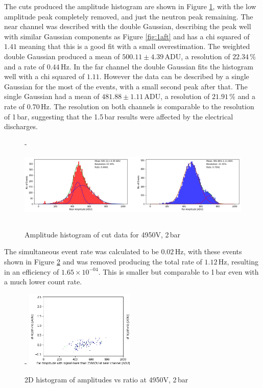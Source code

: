 \documentclass[a4paper]{article}
\begin{document}
\noindent The cuts produced the amplitude histogram are shown in Figure \ref{fig:3amp}, with the low amplitude peak completely removed, and just the neutron peak remaining. 
\newline The near channel was described with the double Gaussian, describing the peak well with similar Gaussian components as Figure \ref{fig:1aft} and has a chi squared of $1.41$ meaning that this is a good fit with a small overestimation. The weighted double Gaussian produced a mean of $500.11 \pm 4.39$\,ADU, a resolution of $22.34$\,\% and a rate of $0.44$\,Hz.
\newline In the far channel the double Gaussian fits the histogram well with a chi squared of $1.11$. However the data can be described by a single Gaussian for the most of the events, with a small second peak after that. The single Gaussian had a mean of $481.88 \pm 1.11$\,ADU, a resolution of $21.91$\,\% and a rate of $0.70$\,Hz. The resolution on both channels is comparable to the resolution of 1\,bar, suggesting that the 1.5\,bar results were affected by the electrical discharges.
\begin{figure}[H]-
    \centering
    \includegraphics[height=3.7cm]{plots/uk26n000_amp.png}
    \caption{Amplitude histogram of cut data for 4950V, 2\,bar}
    \label{fig:3amp}
\end{figure}
\noindent The simultaneous event rate was calculated to be $0.02$\,Hz, with these events shown in Figure \ref{fig:3sym} and was removed producing the total rate of $1.12$\,Hz, resulting in an efficiency of $1.65\times 10^{-04}$. This is smaller but comparable to 1\,bar even with a much lower count rate.
\begin{figure}[H]-
    \centering
    \includegraphics[height=3.7cm]{plots/uk26n000_symcheck2.png}
    \caption{2D histogram of amplitudes vs ratio at 4950V, 2\,bar}
    \label{fig:3sym}
\end{figure}
\end{document}
